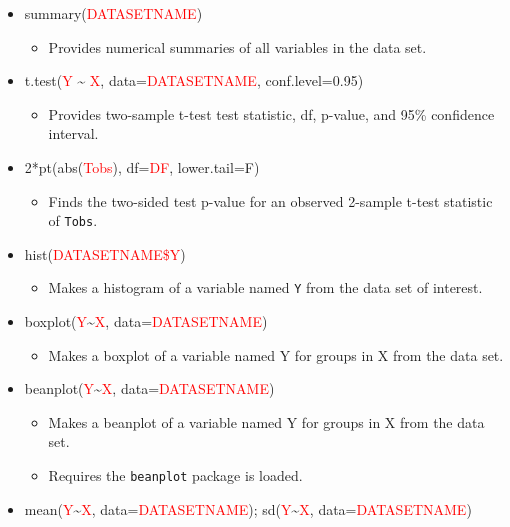 \documentclass[]{book}
\providecommand{\tightlist}{%
  \setlength{\itemsep}{0pt}\setlength{\parskip}{0pt}}
\begin{document}
\begin{itemize}
\item
  summary(\textcolor{red}{DATASETNAME})

  \begin{itemize}
  \tightlist
  \item
    Provides numerical summaries of all variables in the data set.
  \end{itemize}
\item
  t.test(\textcolor{red}{Y} \textasciitilde{} \textcolor{red}{X},
  data=\textcolor{red}{DATASETNAME}, conf.level=0.95)

  \begin{itemize}
  \tightlist
  \item
    Provides two-sample t-test test statistic, df, p-value, and 95\%
    confidence interval.
  \end{itemize}
\item
  2*pt(abs(\textcolor{red}{Tobs}), df=\textcolor{red}{DF}, lower.tail=F)

  \begin{itemize}
  \tightlist
  \item
    Finds the two-sided test p-value for an observed 2-sample t-test
    statistic of \texttt{Tobs}.
  \end{itemize}
\item
  hist(\textcolor{red}{DATASETNAME\$Y})

  \begin{itemize}
  \tightlist
  \item
    Makes a histogram of a variable named \texttt{Y} from the data set
    of interest.
  \end{itemize}
\item
  boxplot(\textcolor{red}{Y}\textasciitilde{}\textcolor{red}{X},
  data=\textcolor{red}{DATASETNAME})

  \begin{itemize}
  \tightlist
  \item
    Makes a boxplot of a variable named Y for groups in X from the data
    set.
  \end{itemize}
\item
  beanplot(\textcolor{red}{Y}\textasciitilde{}\textcolor{red}{X},
  data=\textcolor{red}{DATASETNAME})

  \begin{itemize}
  \item
    Makes a beanplot of a variable named Y for groups in X from the data
    set.
  \item
    Requires the \texttt{beanplot} package is loaded.
  \end{itemize}
\item
  mean(\textcolor{red}{Y}\textasciitilde{}\textcolor{red}{X},
  data=\textcolor{red}{DATASETNAME});
  sd(\textcolor{red}{Y}\textasciitilde{}\textcolor{red}{X},
  data=\textcolor{red}{DATASETNAME})


\end{itemize}
\end{document}
